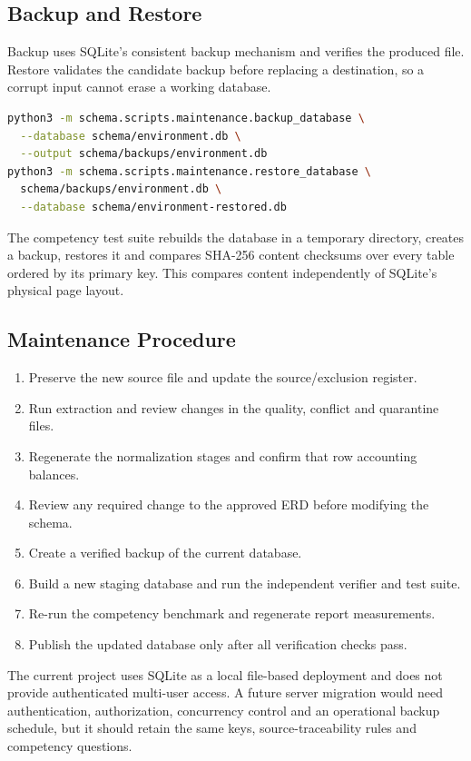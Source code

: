 \subsection{Backup and Restore}
\label{subsec:backup-restore}

Backup uses SQLite's consistent backup mechanism and verifies the produced
file. Restore validates the candidate backup before replacing a destination,
so a corrupt input cannot erase a working database.

\begin{lstlisting}[language=bash,caption={Checked backup and restoration workflow},
label={lst:backup-restore}]
python3 -m schema.scripts.maintenance.backup_database \
  --database schema/environment.db \
  --output schema/backups/environment.db
python3 -m schema.scripts.maintenance.restore_database \
  schema/backups/environment.db \
  --database schema/environment-restored.db
\end{lstlisting}

The competency test suite rebuilds the database in a temporary directory,
creates a backup, restores it and compares SHA-256 content checksums over every
table ordered by its primary key. This compares content independently of
SQLite's physical page layout.

\subsection{Maintenance Procedure}
\label{subsec:maint}

\begin{enumerate}[leftmargin=*]
  \item Preserve the new source file and update the source/exclusion register.
  \item Run extraction and review changes in the quality, conflict and
  quarantine files.
  \item Regenerate the normalization stages and confirm that row accounting
  balances.
  \item Review any required change to the approved ERD before modifying the schema.
  \item Create a verified backup of the current database.
  \item Build a new staging database and run the independent verifier and test
  suite.
  \item Re-run the competency benchmark and regenerate report measurements.
  \item Publish the updated database only after all verification checks pass.
\end{enumerate}

The current project uses SQLite as a local file-based deployment and does not
provide authenticated multi-user access. A future server migration would
need authentication, authorization, concurrency control and an operational
backup schedule, but it should retain the same keys, source-traceability rules and
competency questions.
